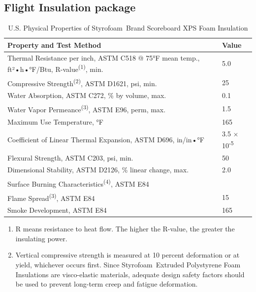 \subsection{Flight Insulation package}
\label{chap:GAPS:thermal:foam}

\begin{table}
\label{table:styrofoam}
\centering
\begin{tabular}{p{}|p{}}
\hline
\textbf{Property and Test Method} & \textbf{Value} \\
\hline
Thermal Resistance per inch, ASTM C518 @ 75°F mean temp., ft²•h•°F/Btu, R-value\textsuperscript{(1)}, min. & 5.0 \\
\hline
Compressive Strength\textsuperscript{(2)}, ASTM D1621, psi, min. & 25 \\
\hline
Water Absorption, ASTM C272, \% by volume, max. & 0.1 \\
\hline
Water Vapor Permeance\textsuperscript{(3)}, ASTM E96, perm, max. & 1.5 \\
\hline
Maximum Use Temperature, °F & 165 \\
\hline
Coefficient of Linear Thermal Expansion, ASTM D696, in/in•°F & 3.5 × 10\textsuperscript{-5} \\
\hline
Flexural Strength, ASTM C203, psi, min. & 50 \\
\hline
Dimensional Stability, ASTM D2126, \% linear change, max. & 2.0 \\
\hline
Surface Burning Characteristics\textsuperscript{(4)}, ASTM E84 & \\
\quad Flame Spread\textsuperscript{(3)}, ASTM E84 & 15 \\
\quad Smoke Development, ASTM E84 & 165 \\
\hline
\end{tabular}

\vspace{0.2cm}
\small
\begin{enumerate}
\setlength\itemsep{0.0em}
\item R means resistance to heat flow. The higher the R-value, the greater the insulating power.
\item Vertical compressive strength is measured at 10 percent deformation or at yield, whichever occurs first. Since Styrofoam\texttrademark~Extruded Polystyrene Foam Insulations are visco-elastic materials, adequate design safety factors should be used to prevent long-term creep and fatigue deformation.
\end{enumerate}
\caption{U.S. Physical Properties of Styrofoam\texttrademark~Brand Scoreboard XPS Foam Insulation}
\label{tab:styrofoam_properties}
\end{table}

